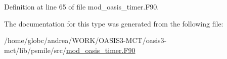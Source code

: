 Definition at line 65 of file mod\+\_\+oasis\+\_\+timer.\+F90.



The documentation for this type was generated from the following file\+:\begin{DoxyCompactItemize}
\item 
/home/globc/andrea/\+W\+O\+R\+K/\+O\+A\+S\+I\+S3-\/\+M\+C\+T/oasis3-\/mct/lib/psmile/src/\hyperlink{mod__oasis__timer_8_f90}{mod\+\_\+oasis\+\_\+timer.\+F90}\end{DoxyCompactItemize}
